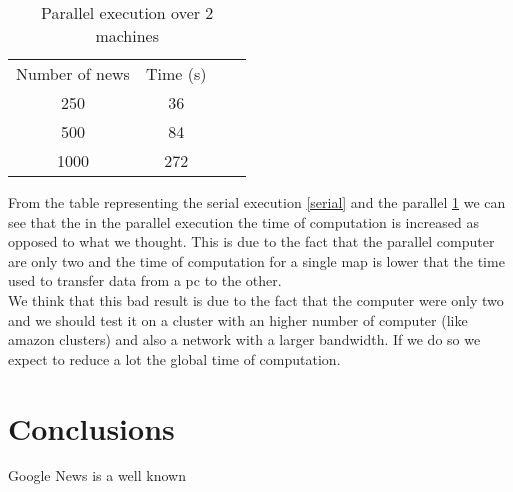\documentclass{acm_proc_article-sp}
\begin{document}
\begin{table}[!ht]
\centering
\label{parallel}
\begin{tabular}{cccc}
Number of news & Time (s) \\
250            & 36       \\
500            & 84       \\
1000           & 272      \\
\end{tabular}
\caption{Parallel execution over 2 machines}
\end{table}

From the table representing the serial execution \ref{serial} and the parallel \ref{parallel} we can see that the in the parallel execution the time of computation is increased as opposed to what we thought. This is due to the fact that the parallel computer are only two and the time of computation for a single map is lower that the time used to transfer data from a pc to the other. \\We think that this bad result is due to the fact that the computer were only two and we should test it on a cluster with an higher number of computer (like amazon clusters) and also a network with a larger bandwidth. If we do so we expect to reduce a lot the global time of computation.



\section{Conclusions}
Google News is a well known 




\balancecolumns
\end{document}
